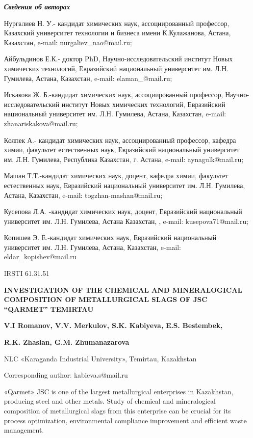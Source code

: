 \emph{\textbf{Сведения об авторах}}

Нургалиев Н. У.- кандидат химических наук, ассоциированный профессор,
Казахский университет технологии и бизнеса имени К.Кулажанова, Астана,
Казахстан, e-mail: nurgaliev\_nao@mail.ru;

Айбульдинов Е.К.- доктор PhD, Научно-исследовательский институт Новых
химических технологий, Евразийский национальный университет им. Л.Н.
Гумилева, Астана, Казахстан, e-mail: elaman\_@mail.ru;

Искакова Ж. Б.-кандидат химических наук, ассоциированный профессор,
Научно-исследовательский институт Новых химических технологий,
Евразийский национальный университет им. Л.Н. Гумилева, Астана,
Казахстан, e-mail: zhanariskakova@mail.ru;

Колпек А.- кандидат химических наук, ассоциированный профессор, кафедра
химии, факультет естественных наук, Евразийский национальный университет
им. Л.Н. Гумилева, Республика Казахстан, г. Астана, e-mail:
aynagulk@mail.ru;

Машан Т.Т.-кандидат химических наук, доцент, кафедра химии, факультет
естественных наук, Евразийский национальный университет им. Л.Н.
Гумилева, Астана, Казахстан, e-mail: togzhan-mashan@mail.ru;

Кусепова Л.А. -кандидат химических наук, доцент, Евразийский
национальный университет им. Л.Н. Гумилева, Астана Казахстан, , e-mail:
kusepova71@mail.ru;

Копишев Э. Е.-кандидат химических наук, Евразийский национальный
университет им. Л.Н. Гумилева, Астана, Казахстан, e-mail:
eldar\_kopishev@mail.ru

IRSTI 61.31.51

\textbf{INVESTIGATION OF THE CHEMICAL AND MINERALOGICAL COMPOSITION OF
METALLURGICAL SLAGS OF JSC ``QARMET'' TEMIRTAU}

\textbf{V.I Romanov, V.V. Merkulov, S.K. Kabiyeva, E.S. Bestembek,}

\textbf{R.K. Zhaslan, G.M. Zhumanazarova}

NLC «Karaganda Industrial University», Temirtau, Kazakhstan

Corresponding author: kabieva.s@mail.ru

«Qarmet» JSC is one of the largest metallurgical enterprises in
Kazakhstan, producing steel and other metals. Study of chemical and
mineralogical composition of metallurgical slags from this enterprise
can be crucial for its process optimization, environmental compliance
improvement and efficient waste management.

